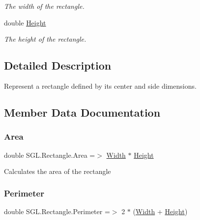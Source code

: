 \begin{DoxyCompactItemize}
\begin{DoxyCompactList}\small\item\em The width of the rectangle. \end{DoxyCompactList}\item 
double \mbox{\hyperlink{class_s_g_l_1_1_rectangle_ae241fbf3d3bc711d0046d10e1954baa2}{Height}}
\begin{DoxyCompactList}\small\item\em The height of the rectangle. \end{DoxyCompactList}\end{DoxyCompactItemize}


\subsection{Detailed Description}
Represent a rectangle defined by its center and side dimensions. 



\subsection{Member Data Documentation}
\mbox{\label{class_s_g_l_1_1_rectangle_ac84a60fb0f1f84cc3f36e488e5aafc29}} 
\subsubsection{\texorpdfstring{Area}{Area}}
{\footnotesize\ttfamily double S\+G\+L.\+Rectangle.\+Area =$>$ \mbox{\hyperlink{class_s_g_l_1_1_rectangle_a717f64d0b1a88f2901ebb53bf5fdac72}{Width}} $\ast$ \mbox{\hyperlink{class_s_g_l_1_1_rectangle_ae241fbf3d3bc711d0046d10e1954baa2}{Height}}}



Calculates the area of the rectangle 

\mbox{\label{class_s_g_l_1_1_rectangle_ae8af552e7b19677d60d33977ce2d39dc}} 
\subsubsection{\texorpdfstring{Perimeter}{Perimeter}}
{\footnotesize\ttfamily double S\+G\+L.\+Rectangle.\+Perimeter =$>$ 2 $\ast$ (\mbox{\hyperlink{class_s_g_l_1_1_rectangle_a717f64d0b1a88f2901ebb53bf5fdac72}{Width}} + \mbox{\hyperlink{class_s_g_l_1_1_rectangle_ae241fbf3d3bc711d0046d10e1954baa2}{Height}})}



